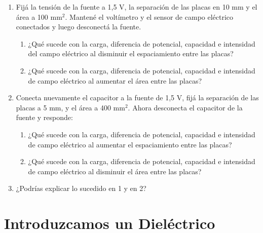 \documentclass[12pt]{report}
\begin{document}
\begin{enumerate}
    \item Fijá la tensión de la fuente a 1,5 V, la separación de las placas en 10 mm y el área a 100 mm$^2$. Mantené el voltímetro y el sensor de campo eléctrico conectados y luego desconectá la fuente.
    \begin{enumerate}
        \item ¿Qué sucede con la carga, diferencia de potencial, capacidad e intensidad del campo eléctrico al disminuir el espaciamiento entre las placas?
        \item ¿Qué sucede con la carga, diferencia de potencial, capacidad e intensidad de campo eléctrico al aumentar el área entre las placas?
    \end{enumerate}
    \item Conecta nuevamente el capacitor a la fuente de 1,5 V, fijá la separación de las placas a 5 mm, y el área a 400 mm$^2$. Ahora desconecta el capacitor de la fuente y responde:
    \begin{enumerate}
        \item ¿Qué sucede con la carga, diferencia de potencial, capacidad e intensidad de campo eléctrico al aumentar el espaciamiento entre las placas?
        \item ¿Qué sucede con la carga, diferencia de potencial, capacidad e intensidad de campo eléctrico al disminuir el área entre las placas?
    \end{enumerate}
    \item ¿Podrías explicar lo sucedido en 1 y en 2?
\end{enumerate}

\section{Introduzcamos un Dieléctrico}
\end{document}
